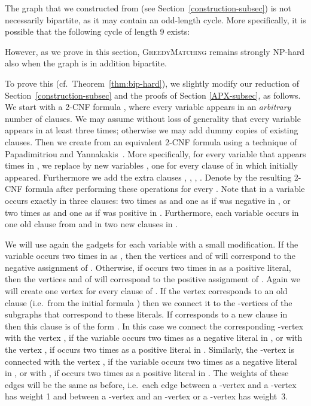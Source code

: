 \documentclass[a4paper,11pt]{article}
\newcommand{\greedy}{\textsc{GreedyMatching}\xspace}
\begin{document}
The graph  that we constructed from  (see Section~\ref {construction-subsec}) is not necessarily bipartite, as it may contain an
odd-length cycle. More specifically, it is possible that the following cycle
of length 9 exists: 

However, as we prove in this section, \greedy remains
strongly NP-hard also when the graph is in addition
bipartite.

To prove this (cf.~Theorem~\ref{thm:bip-hard}), we slightly modify our
reduction of Section~\ref{construction-subsec} and the proofs of Section \ref {APX-subsec}, as follows. We start with a 2-CNF formula , where every
variable appears in an \emph{arbitrary} number of clauses. We may assume
without loss of generality that every variable appears in  at least
three times; otherwise we may add dummy copies of existing clauses. Then we
create from  an equivalent 2-CNF formula  using a
technique of Papadimitriou and Yannakakis~\cite{PY91}. More specifically,
for every variable  that appears  times in , we
replace  by  new variables , one for
every clause of  in which  initially appeared. Furthermore
we add the  extra clauses , , , . Denote by  the resulting 2-CNF formula after
performing these operations for every . Note that in  a variable  occurs exactly in three clauses: two
times as  and one as  if  was
negative in , or two times as  and one as  if  was positive in . Furthermore, each
variable  occurs in one old clause from  and in two new
clauses in .

We will use again the gadgets  for each
variable  with a small modification. If the variable 
occurs two times in  as , then the
vertices  and  of  will correspond to the negative assignment of . Otherwise, if  occurs two times in  as a
positive literal, then the vertices  and  of  will correspond to the
positive assignment of . Again we will create one vertex 
for every clause  of . If the vertex 
corresponds to an old clause (i.e.~from the initial formula ) then we
connect it to the -vertices of the subgraphs  that correspond to these literals. If  corresponds to a
new clause in  then this clause is of the form . In this case we connect the corresponding -vertex with the vertex , if the variable 
occurs two times as a negative literal in , or with the
vertex , if  occurs two times as a positive
literal in . Similarly, the -vertex is connected with
the vertex , if the variable  occurs two
times as a negative literal in , or with , if  occurs two times as a positive literal in . The weights of these edges will be the same as before,
i.e.~each edge between a -vertex and a -vertex has weight 1 and
between a -vertex and an -vertex or a -vertex has
weight~3.
\end{document}
